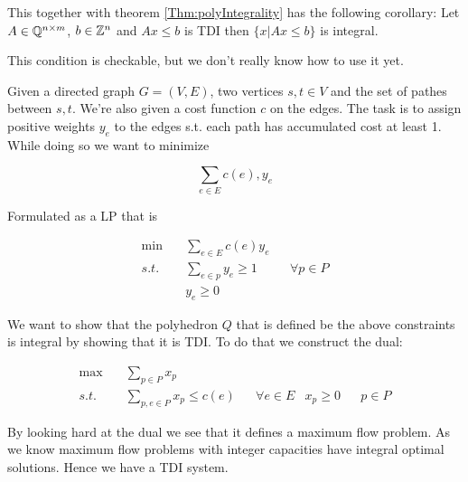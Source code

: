 This together with theorem \ref{Thm:polyIntegrality} has the following corollary: Let $A\in \mathbb{Q}^{n\times m}$, $b\in \mathbb{Z}^n$ and $Ax\leq b$ is TDI then $\{x|Ax\leq b\}$ is integral.

This condition is checkable, but we don't really know how to use it yet.

\begin{Ex} Given a directed graph $G=(V,E)$, two vertices $s,t\in V$ and the set of pathes between $s,t$. We're also given a cost function $c$ on the edges. The task is to assign positive weights $y_e$ to the edges s.t. each path has accumulated cost at least 1. While doing so we want to minimize

\[\sum_{e\in E} c(e), y_e\]

Formulated as a LP that is 

\begin{align*}
\min \quad & \sum_{e\in E} c(e) y_e\\
s.t. & \sum_{e\in p} y_e \geq 1 && \forall p\in P\\
&y_e \geq 0
\end{align*}

We want to show that the polyhedron $Q$ that is defined be the above constraints is integral by showing that it is TDI. To do that we construct the dual:

\begin{align*}
\max \quad & \sum_{p\in P} x_p\\
s.t. & \sum_{p,e\in P} x_p \leq c(e) && \forall e\in E
 & x_p \geq 0 && p\in P
\end{align*}

By looking hard at the dual we see that it defines a maximum flow problem. As we know maximum flow problems with integer capacities have integral optimal solutions. Hence we have a TDI system.
\end{Ex}